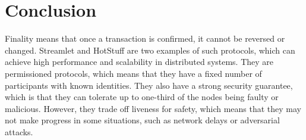 \section*{Conclusion}
Finality means that once a transaction is confirmed, it cannot be reversed or changed. Streamlet and HotStuff are two examples of such protocols, which can achieve high performance and scalability in distributed systems. They are permissioned protocols, which means that they have a fixed number of participants with known identities. They also have a strong security guarantee, which is that they can tolerate up to one-third of the nodes being faulty or malicious. However, they trade off liveness for safety, which means that they may not make progress in some situations, such as network delays or adversarial attacks.
